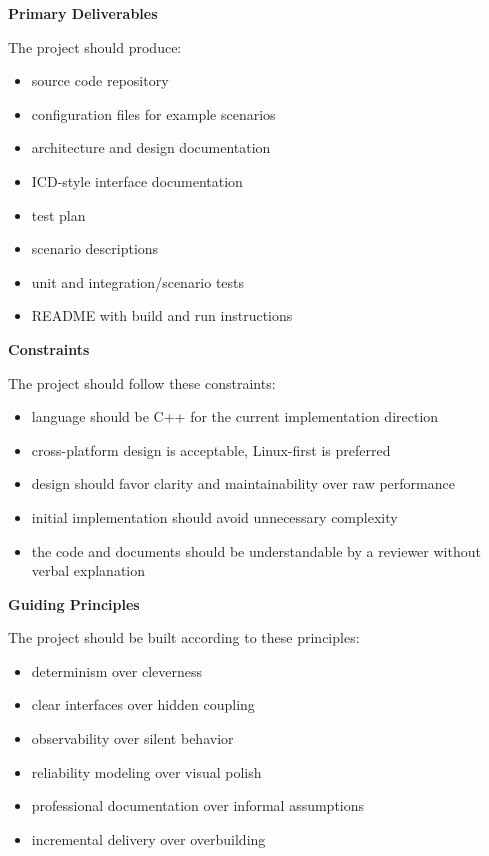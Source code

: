 \documentclass[12pt]{article}
\begin{document}
\textbf{Primary Deliverables}

The project should produce:

\begin{itemize}[leftmargin=*]
    \item source code repository
    \item configuration files for example scenarios
    \item architecture and design documentation
    \item ICD-style interface documentation
    \item test plan
    \item scenario descriptions
    \item unit and integration/scenario tests
    \item README with build and run instructions
\end{itemize}

\textbf{Constraints}

The project should follow these constraints:

\begin{itemize}[leftmargin=*]
    \item language should be C++ for the current implementation direction
    \item cross-platform design is acceptable, Linux-first is preferred
    \item design should favor clarity and maintainability over raw performance
    \item initial implementation should avoid unnecessary complexity
    \item the code and documents should be understandable by a reviewer without verbal explanation
\end{itemize}

\textbf{Guiding Principles}

The project should be built according to these principles:

\begin{itemize}[leftmargin=*]
    \item determinism over cleverness
    \item clear interfaces over hidden coupling
    \item observability over silent behavior
    \item reliability modeling over visual polish
    \item professional documentation over informal assumptions
    \item incremental delivery over overbuilding
\end{itemize}
\end{document}
